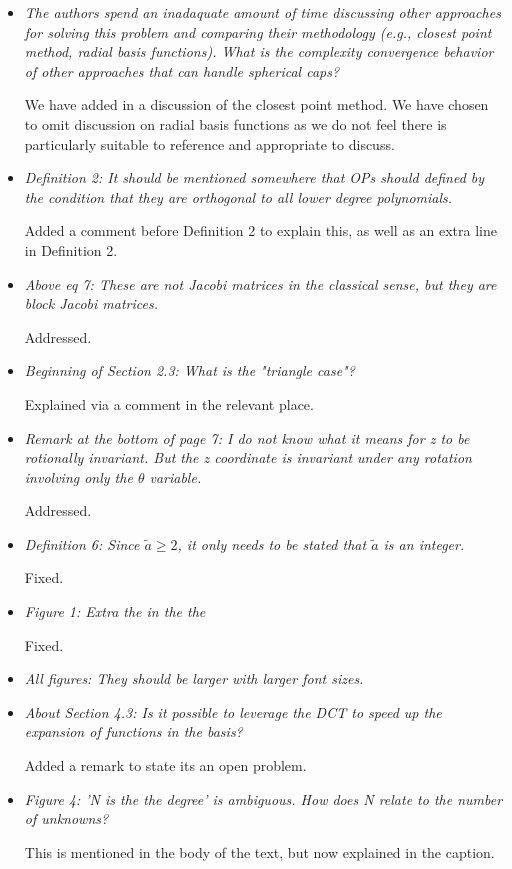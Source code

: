 \documentclass[10pt]{letter}
\newcommand{\comment}[1]{\textit{\color{bluey}#1}}
\newcommand{\bstodoinline}{\todo[color=pink,inline=true]}
\begin{document}
\begin{itemize}[parsep=1em,leftmargin=1em]

\item \comment{The authors spend an inadaquate amount of time discussing other approaches for solving this problem and comparing their methodology (e.g., closest point method, radial basis functions). What is the complexity convergence behavior of other approaches that can handle spherical caps?}

We have added in a discussion of the closest point method. We have chosen to omit discussion on radial basis functions as we do not feel there is particularly suitable to reference and appropriate to discuss.


\item \comment{Definition 2: It should be mentioned somewhere that OPs should defined by the condition that they are orthogonal to all lower degree polynomials.}

Added a comment before Definition 2 to explain this, as well as an extra line in Definition 2.


\item \comment{Above eq 7: These are not Jacobi matrices in the classical sense, but they are block Jacobi matrices.}

Addressed.


\item \comment{Beginning of Section 2.3: What is the "triangle case"?}

Explained via a comment in the relevant place.


\item \comment{Remark at the bottom of page 7: I do not know what it means for z to be rotionally invariant. But the z coordinate is invariant under any rotation involving only the $\theta$ variable.}

Addressed.


\item \comment{Definition 6: Since $\tilde a \ge 2$, it only needs to be stated that $\tilde a$ is an integer.}

Fixed.


\item \comment{Figure 1: Extra the in the the}

Fixed.


\item \comment{All figures: They should be larger with larger font sizes.}

\bstodoinline{Fix this}


\item \comment{About Section 4.3: Is it possible to leverage the DCT to speed up the expansion of functions in the basis?}

Added a remark to state its an open problem.


\item \comment{Figure 4: 'N is the the degree' is ambiguous. How does N relate to the number of unknowns?}

This is mentioned in the body of the text, but now explained in the caption.


\end{itemize}
\end{document}
